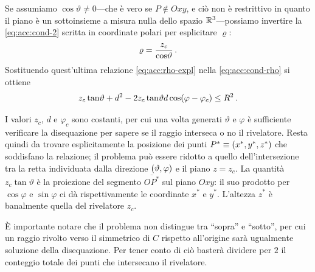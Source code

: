             Se assumiamo $\cos\!\vartheta \neq 0$---che è vero se $P \notin Oxy$, e ciò non è restrittivo in quanto il piano è un sottoinsieme a misura nulla dello spazio $\mathbb{R}^3$---possiamo invertire la \eqref{eq:acc:cond-2} scritta in coordinate polari per esplicitare $\varrho$:
            \begin{equation}
                \varrho = \frac{z_c}{\cos\!\vartheta}
                \,.
                \label{eq:acc:rho-expl}
            \end{equation}
            Sostituendo quest'ultima relazione \eqref{eq:acc:rho-expl} nella \eqref{eq:acc:cond-rho} si ottiene
            \begin{equation}
                z_c \tan\!\vartheta + d^2 - 2 z_c \tan\!\vartheta d \cos\!\pqty{\varphi - \varphi_c} \leq R^2
                \myperiod
                \label{eq:acc:diseq}
            \end{equation}

            I valori $z_c$, $d$ e $\varphi_c$ sono costanti, per cui una volta generati $\vartheta$ e $\varphi$ è sufficiente verificare la disequazione per sapere se il raggio interseca o no il rivelatore. Resta quindi da trovare esplicitamente la posizione dei punti $P^*\equiv\pqty{x^*, y^*, z^*}$ che soddisfano la relazione; il problema può essere ridotto a quello dell'intersezione tra la retta individuata dalla direzione $\pqty{\vartheta,\varphi}$ e il piano $z = z_c$. La quantità $z_c \tan\!\vartheta$ è la proiezione del segmento $\overline{OP^*}$ sul piano $Oxy$: il suo prodotto per $\cos\!\varphi$ e $\sin\!\varphi$ ci dà rispettivamente le coordinate $x^*$ e $y^*$. L'altezza $z^*$ è banalmente quella del rivelatore $z_c$.
            
            È importante notare che il problema non distingue tra ``sopra'' e ``sotto'', per cui un raggio rivolto verso il simmetrico di $C$ rispetto all'origine sarà ugualmente soluzione della disequazione. Per tener conto di ciò basterà dividere per $2$ il conteggio totale dei punti che intersecano il rivelatore.

